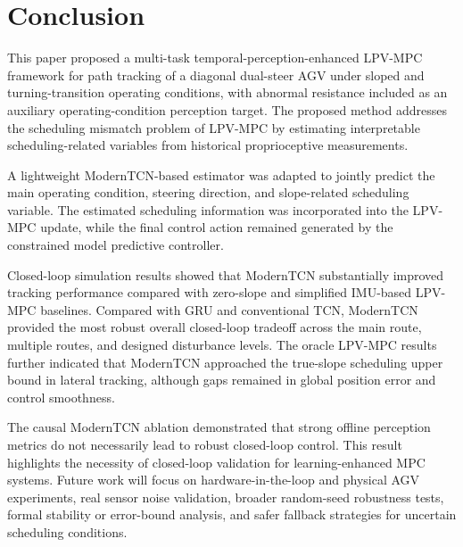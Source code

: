 \documentclass{ieeeaccess}
\begin{document}
\section{Conclusion}

\label{sec:conclusion}



This paper proposed a multi-task temporal-perception-enhanced LPV-MPC framework for path tracking of a diagonal dual-steer AGV under sloped and turning-transition operating conditions, with abnormal resistance included as an auxiliary operating-condition perception target. The proposed method addresses the scheduling mismatch problem of LPV-MPC by estimating interpretable scheduling-related variables from historical proprioceptive measurements.



A lightweight ModernTCN-based estimator was adapted to jointly predict the main operating condition, steering direction, and slope-related scheduling variable. The estimated scheduling information was incorporated into the LPV-MPC update, while the final control action remained generated by the constrained model predictive controller.



Closed-loop simulation results showed that ModernTCN substantially improved tracking performance compared with zero-slope and simplified IMU-based LPV-MPC baselines. Compared with GRU and conventional TCN, ModernTCN provided the most robust overall closed-loop tradeoff across the main route, multiple routes, and designed disturbance levels. The oracle LPV-MPC results further indicated that ModernTCN approached the true-slope scheduling upper bound in lateral tracking, although gaps remained in global position error and control smoothness.



The causal ModernTCN ablation demonstrated that strong offline perception metrics do not necessarily lead to robust closed-loop control. This result highlights the necessity of closed-loop validation for learning-enhanced MPC systems. Future work will focus on hardware-in-the-loop and physical AGV experiments, real sensor noise validation, broader random-seed robustness tests, formal stability or error-bound analysis, and safer fallback strategies for uncertain scheduling conditions.


% 
% 

\EOD
\end{document}
